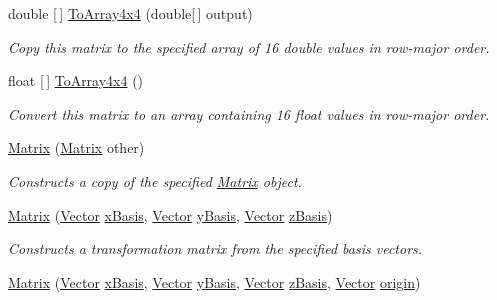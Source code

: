 \begin{DoxyCompactItemize}
double \mbox{[}$\,$\mbox{]} \mbox{\hyperlink{struct_leap_1_1_matrix_a71e674a52a30d274a48980f86bfe0115}{To\+Array4x4}} (double\mbox{[}$\,$\mbox{]} output)
\begin{DoxyCompactList}\small\item\em Copy this matrix to the specified array of 16 double values in row-\/major order. \end{DoxyCompactList}\item 
float \mbox{[}$\,$\mbox{]} \mbox{\hyperlink{struct_leap_1_1_matrix_a211644064b986fe18caa2902150ad9aa}{To\+Array4x4}} ()
\begin{DoxyCompactList}\small\item\em Convert this matrix to an array containing 16 float values in row-\/major order. \end{DoxyCompactList}\item 
\mbox{\hyperlink{struct_leap_1_1_matrix_a0070eab9ad17515aec4d27e93c8037bb}{Matrix}} (\mbox{\hyperlink{struct_leap_1_1_matrix}{Matrix}} other)
\begin{DoxyCompactList}\small\item\em Constructs a copy of the specified \mbox{\hyperlink{struct_leap_1_1_matrix}{Matrix}} object. \end{DoxyCompactList}\item 
\mbox{\hyperlink{struct_leap_1_1_matrix_a47bc47324a84f42179a8717fa4f40817}{Matrix}} (\mbox{\hyperlink{struct_leap_1_1_vector}{Vector}} \mbox{\hyperlink{struct_leap_1_1_matrix_a5778d424f6d76d84fe7a479b936b06ad}{x\+Basis}}, \mbox{\hyperlink{struct_leap_1_1_vector}{Vector}} \mbox{\hyperlink{struct_leap_1_1_matrix_a1349c27faa44dff7480ca0e3d4a093f0}{y\+Basis}}, \mbox{\hyperlink{struct_leap_1_1_vector}{Vector}} \mbox{\hyperlink{struct_leap_1_1_matrix_a26972992e511c04bcd5705e7d4153fd1}{z\+Basis}})
\begin{DoxyCompactList}\small\item\em Constructs a transformation matrix from the specified basis vectors. \end{DoxyCompactList}\item 
\mbox{\hyperlink{struct_leap_1_1_matrix_a803a35361c96dfbf8c8116b070b0c404}{Matrix}} (\mbox{\hyperlink{struct_leap_1_1_vector}{Vector}} \mbox{\hyperlink{struct_leap_1_1_matrix_a5778d424f6d76d84fe7a479b936b06ad}{x\+Basis}}, \mbox{\hyperlink{struct_leap_1_1_vector}{Vector}} \mbox{\hyperlink{struct_leap_1_1_matrix_a1349c27faa44dff7480ca0e3d4a093f0}{y\+Basis}}, \mbox{\hyperlink{struct_leap_1_1_vector}{Vector}} \mbox{\hyperlink{struct_leap_1_1_matrix_a26972992e511c04bcd5705e7d4153fd1}{z\+Basis}}, \mbox{\hyperlink{struct_leap_1_1_vector}{Vector}} \mbox{\hyperlink{struct_leap_1_1_matrix_a8ba63742492635361dcd771e392bbce6}{origin}})

\end{DoxyCompactItemize}
